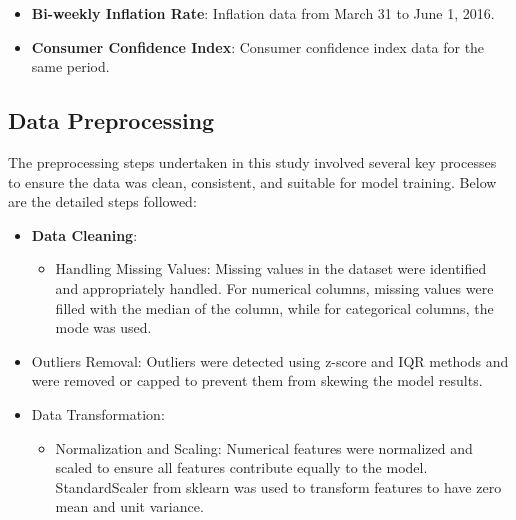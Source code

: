 \documentclass[letterpaper, 10 pt, conference]{ieeeconf}  %
\begin{document}
\begin{itemize}
        \item \textbf{Bi-weekly Inflation Rate}: Inflation data from March 31 to June 1, 2016.
        \item \textbf{Consumer Confidence Index}: Consumer confidence index data for the same period.
\end{itemize}

\subsection{Data Preprocessing}
The preprocessing steps undertaken in this study involved several key processes to ensure the data was clean, consistent, and suitable for model training. Below are the detailed steps followed:
\begin{itemize}                
        \item \textbf{Data Cleaning}: 
        \begin{itemize}
                \item Handling Missing Values: Missing values in the dataset were identified and appropriately handled. For numerical columns, missing values were filled with the median of the column, while for categorical columns, the mode was used.        
        \end{itemize}
        \item Outliers Removal: Outliers were detected using z-score and IQR methods and were removed or capped to prevent them from skewing the model results.
        
        \item Data Transformation:
        \begin{itemize}
                \item Normalization and Scaling: Numerical features were normalized and scaled to ensure all features contribute equally to the model. StandardScaler from sklearn was used to transform features to have zero mean and unit variance.
        \end{itemize}
        

\end{itemize}
\end{document}
